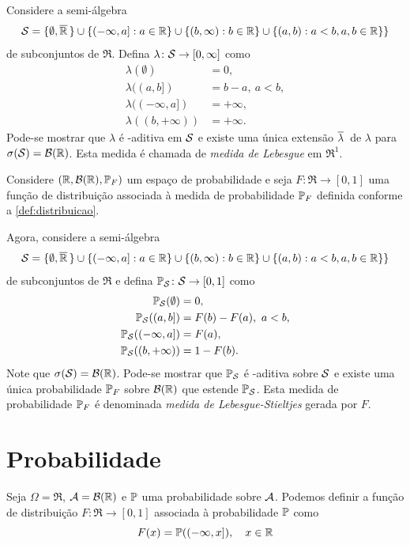 \begin{definition}
	Considere a semi-álgebra
	\[
		\Scal = \{\emptyset, \Ree\} \cup \{(-\infty, a] : a \in \Re\}
		\cup \{(b, \infty) : b \in \Re\}
		\cup \{(a, b) : a<b, a,b \in \Re\} \}
	\]
	de subconjuntos de $\Re$. Defina $\lambda\colon \Scal \to [0, \infty]$ como
	\begin{align*}
		\lambda(\emptyset)   &= 0, \\
		\lambda((a, b])        &= b-a, \ a<b, \\
		\lambda((-\infty, a]) &= +\infty, \\
		\lambda((b, +\infty))  &= +\infty.
	\end{align*}
	Pode-se mostrar que $\lambda$ é \sig-aditiva em $\Scal$ e existe uma única extensão $\widebar{\lambda}$ de $\lambda$ para $\sigma(\Scal) = \Bo$. Esta medida é chamada de \textit{medida de Lebesgue} em $\Re^1$.
\end{definition}

\begin{definition}
	Considere $(\Re, \Bo, \P_F)$ um espaço de probabilidade e seja $F\colon \Re\to [0,1]$ uma função de distribuição associada à medida de probabilidade $\P_F$ definida conforme a \cref{def:distribuicao}.
	 
	Agora, considere a semi-álgebra
	\[
	\Scal = \{\emptyset, \Ree\} \cup \{(-\infty, a] : a \in \Re\}
	\cup \{(b, \infty) : b \in \Re\}
	\cup \{(a, b) : a<b, a,b \in \Re\} \}
	\]
	de subconjuntos de $\Re$ e defina $\P_\Scal\colon \Scal \to [0,1]$ como
	\begin{align*}
		\P_\Scal(\emptyset)   &= 0, \\
		\P_\Scal((a, b])        &= F(b)-F(a), \ a<b, \\
		\P_\Scal((-\infty, a]) &= F(a), \\
		\P_\Scal((b, +\infty))  &= 1-F(b).
	\end{align*}
	Note que $\sigma(\Scal) = \Bo$. Pode-se mostrar que $\P_\Scal$ é \sig-aditiva sobre $\Scal$ e existe uma única probabilidade $\P_F$ sobre $\Bo$ que estende $\P_\Scal$. Esta medida de probabilidade $\P_F$ é denominada \textit{medida de Lebesgue-Stieltjes} gerada por $F$.
\end{definition}
	

\section{Probabilidade}

\begin{definition}\label{def:distribuicao}
	Seja $\Omega=\Re$, $\Acal=\Bo$ e $\P$ uma probabilidade sobre $\Acal$. Podemos definir a função de distribuição $F\colon\Re\to[0,1]$ associada à probabilidade $\P$ como
	\[
		F(x) = \P((-\infty,x]), \quad x\in\Re 
	\]

\end{definition}

